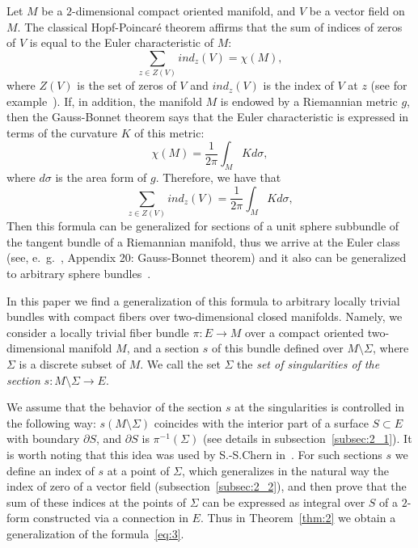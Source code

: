 \documentclass[12pt,letterpaper]{amsart}
\theoremstyle{definition}
\theoremstyle{plain}
\theoremstyle{remark}
\begin{document}
Let $M$ be a $2$-dimensional compact oriented manifold, and $V$ be a vector field on $M$.
The classical Hopf-Poincaré theorem affirms that the sum of indices of zeros of $V$ is equal to the Euler characteristic of $M$:
\begin{equation}
\sum_{z \in Z(V)} ind_{z}(V) = \chi(M),
\label{eq:1}
\end{equation}
where $Z(V)$ is the set of zeros of $V$ and $ind_{z}(V)$ is the index of $V$ at $z$ (see for example~\cite{bott_tu1982}).
If, in addition, the manifold $M$ is endowed by a Riemannian metric $g$, then the Gauss-Bonnet theorem says that the Euler characteristic is expressed in terms of the curvature $K$ of this metric:
\begin{equation}
\chi(M) = \frac{1}{2\pi} \int_M K d\sigma,
\label{eq:2}
\end{equation}
where $d\sigma$ is the area form of $g$.
Therefore, we have that
\begin{equation}
\sum_{z \in Z(V)} ind_{z}(V) = \frac{1}{2\pi} \int_M K d\sigma,
\label{eq:3}
\end{equation}
Then this formula can be generalized for sections of a unit sphere subbundle of the tangent bundle of a Riemannian manifold, thus we arrive at the Euler class (see, e.\, g.~\cite{kobayashi_nomizu1969}, Appendix 20: Gauss-Bonnet theorem) and it also can be generalized to arbitrary sphere bundles~\cite{bott_tu1982}.

In this paper we find a generalization of this formula to arbitrary locally trivial bundles with compact fibers over two-dimensional closed manifolds.
Namely, we consider a locally trivial fiber bundle $\pi : E \to M$ over a compact oriented two-dimensional manifold $M$, and a section $s$ of this bundle defined over $M \setminus \Sigma$, where $\Sigma$ is a discrete subset of $M$.
We call the set $\Sigma$ the \emph{set of singularities of the section} $s : M \setminus \Sigma \to E$.

We assume that the behavior of the section $s$ at the singularities is controlled in the following way:
$s(M \setminus \Sigma)$ coincides with the interior part of a surface $S \subset E$ with boundary $\partial S$, and $\partial S$ is $\pi^{-1}(\Sigma)$ (see details in subsection~\ref{subsec:2_1}). 
It is worth noting that this idea was used by S.-S.Chern in~\cite{chern_1944}.  
For such sections $s$ we define an index of $s$ at a point of $\Sigma$, which generalizes in the natural way the index of zero of a vector field (subsection~\ref{subsec:2_2}), and then prove that the sum of these indices at the points of $\Sigma$ can be expressed as integral over $S$ of a $2$-form constructed via a connection in $E$.
Thus in Theorem~\ref{thm:2} we obtain a generalization of the formula~\eqref{eq:3}.
\end{document}
